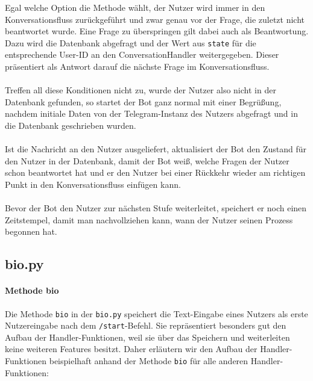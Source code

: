             Egal welche Option die Methode wählt, der Nutzer wird immer in den Konversationsfluss zurückgeführt und zwar genau vor der Frage, die zuletzt nicht beantwortet wurde. Eine Frage zu überspringen gilt dabei auch als Beantwortung. Dazu wird die Datenbank abgefragt und der Wert aus \verb|state| für die entsprechende User-ID an den ConversationHandler weitergegeben. Dieser präsentiert als Antwort darauf die nächste Frage im Konversationsfluss. \\
            \\
            Treffen all diese Konditionen nicht zu, wurde der Nutzer also nicht in der Datenbank gefunden, so startet der Bot ganz normal mit einer Begrüßung, nachdem initiale Daten von der Telegram-Instanz des Nutzers abgefragt und in die Datenbank geschrieben wurden. \\
            \\
            Ist die Nachricht an den Nutzer ausgeliefert, aktualisiert der Bot den Zustand für den Nutzer in der Datenbank, damit der Bot weiß, welche Fragen der Nutzer schon beantwortet hat und er den Nutzer bei einer Rückkehr wieder am richtigen Punkt in den Konversationsfluss einfügen kann.\\
            \\    
            Bevor der Bot den Nutzer zur nächsten Stufe weiterleitet, speichert er noch einen Zeitstempel, damit man nachvollziehen kann, wann der Nutzer seinen Prozess begonnen hat.


        \subsection{bio.py} \label{bio.py}
            \paragraph{Methode bio}
                Die Methode \verb|bio| in der \verb|bio.py| speichert die Text-Eingabe eines Nutzers als erste Nutzereingabe nach dem \verb|/start|-Befehl. Sie repräsentiert besonders gut den Aufbau der Handler-Funktionen, weil sie über das Speichern und weiterleiten keine weiteren Features besitzt. Daher erläutern wir den Aufbau der Handler-Funktionen beispielhaft anhand der Methode \verb|bio| für alle anderen Handler-Funktionen:

